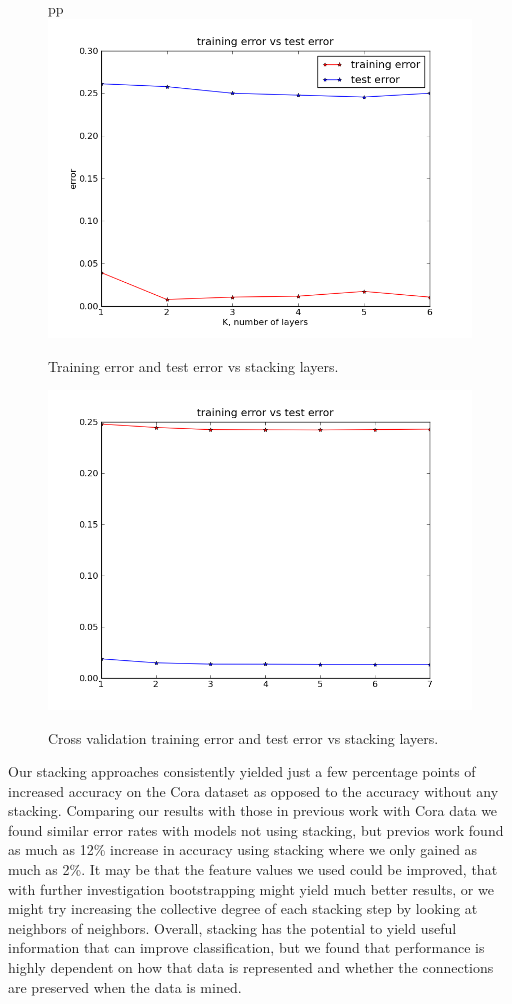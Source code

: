 \documentclass[a4paper,11pt]{article}
\begin{document}
\newpage

\begin{figure}[!ht]
  \caption{Training error and test error vs stacking layers.}
pp  \centering
  \includegraphics[width=4.5in]{WU5/trainingvstestD2R.png}
  \label{figures:f2}
\end{figure}

\begin{figure}[!ht]
  \caption{Cross validation training error and test error vs stacking layers.}
  \centering
  \includegraphics[width=4.5in]{WU5/CrossValidation.png}
  \label{figures:f3}
\end{figure}

\newpage

Our stacking approaches consistently yielded just a few percentage points of
increased accuracy on the Cora dataset as opposed to the accuracy without any stacking. 
Comparing our results with those in previous work with Cora data \footnotemark[\value{footnote}]
we found similar error rates with models not using stacking, but previos work found as much as
12\% increase in accuracy using stacking where we only gained as much as 2\%. It may be that the
feature values we used could be improved, that with further investigation bootstrapping might yield
much better results, or we might try increasing the collective degree of each stacking step by 
looking at neighbors of neighbors. Overall, stacking has the potential to yield useful information
that can improve classification, but we found that performance is highly dependent on how that data is represented and whether
the connections are preserved when the data is mined.
\end{document}
